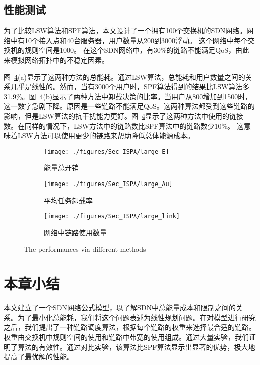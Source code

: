 \subsection{性能测试}

为了比较LSW算法和SPF算法，本文设计了一个拥有100个交换机的SDN网络。网络中有10个接入点和40台服务器，用户数量从200到3000浮动。 这个网络中每个交换机的规则空间是1000。 在这个SDN网络中，有30\%的链路不能满足QoS，由此来模拟网络拓扑中的不稳定因素。

图~\ref{fig_large}(a)显示了这两种方法的总能耗。通过LSW算法，总能耗和用户数量之间的关系几乎是线性的。然而，当有3000个用户时，SPF算法得到的结果比LSW算法多31.9\%。图~\ref{fig_large}(b)显示了两种方法中卸载决策的比率。当用户从800增加到1500时，这一数字急剧下降。原因是一些链路不能满足QoS。这两种算法都受到这些链路的影响，但是LSW算法的抗干扰能力更好。图~\ref{fig_large}显示了这两种方法中使用的链接数。在同样的情况下，LSW方法中的链路数比SPF算法中的链路数少10\%。 这意味着LSW方法可以使用更少的链路来帮助降低总体能源成本。

\begin{figure}[!h]
  \centering
  \begin{subfigure}[b]{0.32\linewidth}
    \texttt{[image: ./figures/Sec\_ISPA/large\_E]}
    \label{fig_largeE}
    \caption{能量总开销}
  \end{subfigure}
  \begin{subfigure}[b]{0.32\linewidth}
    \texttt{[image: ./figures/Sec\_ISPA/large\_Au]}
    \label{fig_largeAu}
    \caption{平均任务卸载率}
  \end{subfigure}
  \begin{subfigure}[b]{0.32\linewidth}
    \texttt{[image: ./figures/Sec\_ISPA/large\_link]}
    \label{fig_largeL}
    \caption{网络中链路使用数量}
  \end{subfigure}
  \caption{The performances via different methods}
  \label{fig_large}
\end{figure}

\section{本章小结}

本文建立了一个SDN网络公式模型，以了解SDN中总能量成本和限制之间的关系。为了最小化总能耗，我们将这个问题表述为线性规划问题。在对模型进行研究之后，我们提出了一种链路调度算法，根据每个链路的权重来选择最合适的链路。权重由交换机中规则空间的使用和链路中带宽的使用组成。通过大量实验，我们证明了算法的有效性。通过对比实验，该算法比SPF算法显示出显著的优势，极大地提高了最优解的性能。


